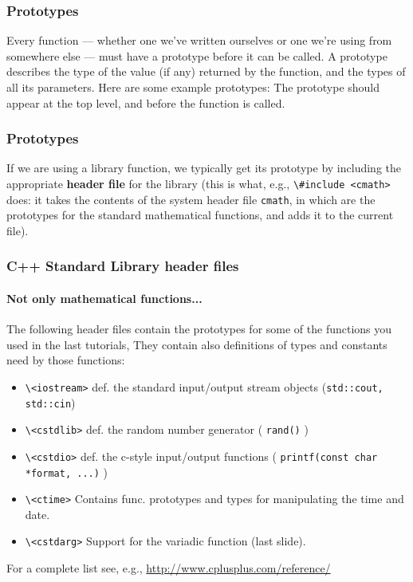 \documentclass[12pt]{beamer}
\begin{document}
\begin{frame}
  \frametitle{Prototypes}
	Every function --- whether one we've written ourselves or one we're
	using from somewhere else --- must have a prototype before it can be
	called. A prototype describes the type of the value (if any) returned
	by the function, and the types of all its parameters. Here are some
	example prototypes:
	\LstProto
	The prototype should appear at the top level, and before the function
	is called.
\end{frame}


\begin{frame}
  \frametitle{Prototypes}
	If we are using a library function, we typically get its prototype by
	including the appropriate \textbf{header file} for the library (this is
	what, e.g., \lstinline/\#include <cmath>/ does: it takes the contents of
	the system header file \lstinline/cmath/, in which are the prototypes
	for the standard mathematical functions, and adds it to the current
	file).
\end{frame}



\begin{frame}
  \frametitle{C++ Standard Library header files}
  \framesubtitle{Not only mathematical functions...}
   The following header files contain the prototypes for some of the functions you used in the last tutorials,
   They contain also definitions of types and constants need by those functions:
   \begin{itemize}
    \item \lstinline/\<iostream>/ def. the standard input/output stream objects (\lstinline/std::cout, std::cin/)
    \item \lstinline/\<cstdlib>/  def. the random number generator ( \lstinline/rand()/ )
    \item \lstinline/\<cstdio>/   def. the c-style input/output functions ( \lstinline/printf(const char *format, ...)/ )
    \item \lstinline/\<ctime>/    Contains func. prototypes and types for manipulating the time and date.
    \item \lstinline/\<cstdarg>/  Support for the variadic function (last slide).
   \end{itemize}
   For a complete list see, e.g., \href{http://www.cplusplus.com/reference/}{http://www.cplusplus.com/reference/}
\end{frame}
\end{document}

